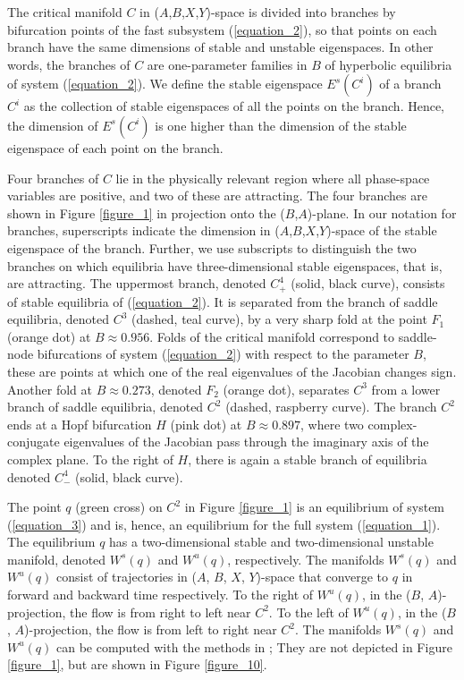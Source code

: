 \documentclass{ws-ijbc}
\begin{document}
The critical manifold $C$ in ($A$,$B$,$X$,$Y$)-space is divided into branches by bifurcation points of the fast subsystem (\ref{equation_2}), so that points on each branch have the same dimensions of stable and unstable eigenspaces.  In other words, the branches of $C$ are one-parameter families in $B$ of hyperbolic equilibria of system (\ref{equation_2}).  We define the stable eigenspace $E^s(C^i)$ of a branch $C^i$ as the collection of stable eigenspaces of all the points on the branch.  Hence, the dimension of $E^s(C^i)$ is one higher than the dimension of the stable eigenspace of each point on the branch. 

Four branches of $C$ lie in the physically relevant region where all phase-space variables are positive, and two of these are attracting.  The four branches are shown in Figure \ref{figure_1} in projection onto the ($B$,$A$)-plane.  In our notation for branches, superscripts indicate the dimension in ($A$,$B$,$X$,$Y$)-space of the stable eigenspace of the branch.  Further, we use subscripts to distinguish the two branches on which equilibria have three-dimensional stable eigenspaces, that is, are attracting.   The uppermost branch, denoted $C^4_+$ (solid, black curve), consists of stable equilibria of (\ref{equation_2}).  It is separated from the branch of saddle equilibria, denoted $C^3$ (dashed, teal curve), by a very sharp fold at the point $F_1$ (orange dot) at $B \approx 0.956$.  Folds of the critical manifold correspond to saddle-node bifurcations of system (\ref{equation_2}) with respect to the parameter $B$, these are points at which one of the real eigenvalues of the Jacobian changes sign.  Another fold at $B \approx 0.273$, denoted $F_2$ (orange dot), separates $C^3$ from a lower branch of saddle equilibria, denoted $C^2$ (dashed, raspberry curve).   The branch $C^2$ ends at a Hopf bifurcation $H$ (pink dot) at $B \approx 0.897$, where two complex-conjugate eigenvalues of the Jacobian pass through the imaginary axis of the complex plane.  To the right of $H$, there is again a stable branch of equilibria denoted $C^4_-$ (solid, black curve).

The point $q$ (green cross) on $C^2$ in Figure \ref{figure_1} is an equilibrium of system (\ref{equation_3}) and is, hence, an equilibrium for the full system (\ref{equation_1}).  The equilibrium $q$ has a two-dimensional stable and two-dimensional unstable manifold, denoted $W^s(q)$ and $W^u(q)$, respectively.  The manifolds $W^{s}(q)$ and $W^{u}(q)$ consist of trajectories in ($A$, $B$, $X$, $Y$)-space that converge to $q$ in forward and backward time respectively.  To the right of $W^u(q)$, in the ($B$, $A$)-projection, the flow is from right to left near $C^2$.  To the left of $W^u(q)$, in the ($B$, $A$)-projection, the flow is from left to right near $C^2$.  The manifolds $W^{s}(q)$ and $W^{u}(q)$ can be computed with the methods in \cite{Red_book}; They are not depicted in Figure \ref{figure_1}, but are shown in Figure \ref{figure_10}.
\end{document}
